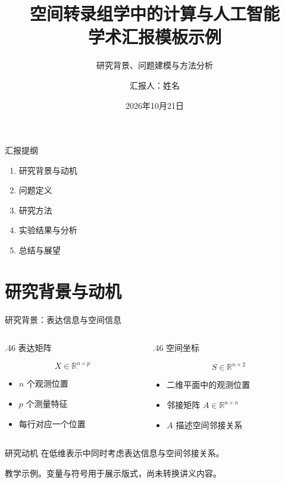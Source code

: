 \documentclass[aspectratio=169,11pt]{beamer}
\title[学术汇报模板]{空间转录组学中的计算与人工智能\\学术汇报模板示例}
\subtitle{研究背景、问题建模与方法分析}
\author[汇报人]{汇报人：姓名}
\institute[单位]{某某大学\quad 某某学院 / 课题组}
\date[2026年10月21日]{2026年10月21日}
\newcommand{\smallnote}[1]{\par{\scriptsize\color{NoteGray}#1\par}}
\newcommand{\bluelabel}[1]{{\color{AcademicBlue}#1}\par}
\newcommand{\spaceditem}{\setlength{\itemsep}{.65em}}
\begin{document}
\begin{frame}
  \titlepage
\end{frame}

\begin{frame}{汇报提纲}
  \begin{enumerate}
    \setlength{\itemsep}{6mm}
    \color{AcademicBlue}
    \item 研究背景与动机
    \item 问题定义
    \item 研究方法
    \item 实验结果与分析
    \item 总结与展望
  \end{enumerate}
\end{frame}

\section{研究背景与动机}
\begin{frame}{研究背景：表达信息与空间信息}
  \begin{columns}[T,onlytextwidth]
    \begin{column}{.46\textwidth}
      \bluelabel{表达矩阵}
      \[
        X\in\mathbb{R}^{n\times p}
      \]
      \begin{itemize}\spaceditem
        \item $n$ 个观测位置
        \item $p$ 个测量特征
        \item 每行对应一个位置
      \end{itemize}
    \end{column}
    \begin{column}{.46\textwidth}
      \bluelabel{空间坐标}
      \[
        S\in\mathbb{R}^{n\times 2}
      \]
      \begin{itemize}\spaceditem
        \item 二维平面中的观测位置
        \item 邻接矩阵 $A\in\mathbb{R}^{n\times n}$
        \item $A$ 描述空间邻接关系
      \end{itemize}
    \end{column}
  \end{columns}
  \vspace{3mm}
  \begin{block}{研究动机}
    在低维表示中同时考虑表达信息与空间邻接关系。
  \end{block}
  \vspace{2mm}
  \smallnote{教学示例。变量与符号用于展示版式，尚未转换讲义内容。}
\end{frame}
\end{document}
